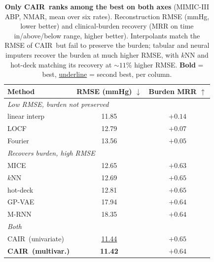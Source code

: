 \begin{table}[t]
  \centering
  {\small
  \setlength{\tabcolsep}{4pt}
  \begin{tabular}{lcc}
  \toprule
  Method & RMSE (mmHg) $\downarrow$ & Burden MRR $\uparrow$ \\
  \midrule
  \multicolumn{3}{l}{\emph{Low RMSE, burden not preserved}} \\
  \quad linear interp & 11.85 & $+0.14$ \\
  \quad LOCF & 12.79 & $+0.07$ \\
  \quad Fourier & 13.56 & $+0.05$ \\
  \midrule
  \multicolumn{3}{l}{\emph{Recovers burden, high RMSE}} \\
  \quad MICE & 12.65 & $+0.63$ \\
  \quad $k$NN & 12.69 & $\mathbf{+0.65}$ \\
  \quad hot-deck & 12.81 & $\mathbf{+0.65}$ \\
  \quad GP-VAE & 17.94 & $+0.64$ \\
  \quad M-RNN & 18.35 & $+0.64$ \\
  \midrule
  \multicolumn{3}{l}{\emph{Both}} \\
  \quad CAIR\ (univariate) & \underline{11.44} & $\mathbf{+0.65}$ \\
  \quad \textbf{CAIR\ (multivar.)} & \textbf{11.42} & $+0.64$ \\
  \bottomrule
  \end{tabular}}
  \caption{\textbf{Only CAIR\ ranks among the best on both axes} (MIMIC-III ABP,
  NMAR, mean over six rates). Reconstruction RMSE (mmHg, lower better) and
  clinical-burden recovery (MRR on time in/above/below range, higher better).
  Interpolants match the RMSE of CAIR\ but fail to preserve the burden; tabular and neural
  imputers recover the burden at much higher RMSE, with $k$NN and hot-deck
  matching its recovery at ${\sim}11\%$ higher RMSE. \textbf{Bold} = best, \underline{underline} = second best, per column.}
  \label{tab:mimic-down}
\end{table}

